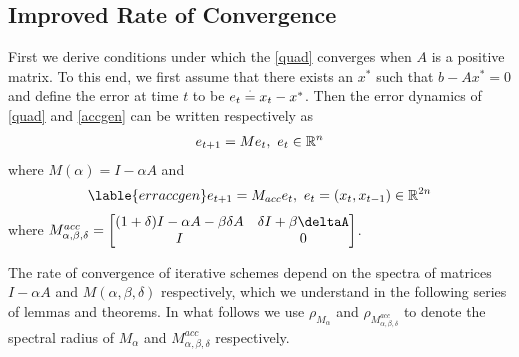 \subsection{Improved Rate of Convergence}
First we derive conditions under which the \eqref{quad} converges when $A$ is a positive matrix. To this end, we first assume that there exists an $x^*$ such that $b-Ax^*=0$ and define the error at time $t$ to be $e_t\stackrel{\cdot}{=} x_t-x^*$. Then the error dynamics of \eqref{quad} and \eqref{accgen} can be written respectively as
\begin{align}\label{errquad}
e_{t+1}=M e_{t}, ~e_t \in \mathbb{R}^n
\end{align}
where $M(\alpha)=I-\alpha A$
and
\begin{align}\lable{erraccgen}
e_{t+1}=M_{acc} e_{t},  ~e_t =(x_t,x_{t-1}) \in \R^{2n}
\end{align}
where $M^{acc}_{\alpha,\beta,\delta}=\begin{bmatrix} (1+\delta)I-\alpha A-\beta\delta A & \delta I+\beta \deltaA \\ I &0\\\end{bmatrix}$.\par
The rate of convergence of iterative schemes depend on the spectra of matrices $I-\alpha A$ and $M(\alpha,\beta,\delta)$ respectively, which we understand in the following series of lemmas and theorems. In what follows we use $\rho_{M_{\alpha}}$ and $\rho_{M^{acc}_{\alpha,\beta,\delta}}$ to denote the spectral radius of $M_\alpha$ and $M^{acc}_{\alpha,\beta,\delta}$ respectively.
